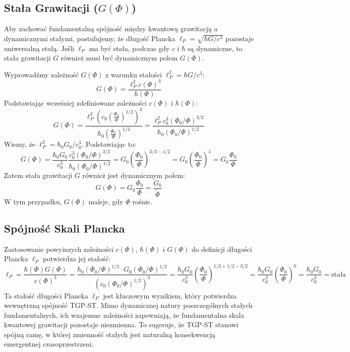 \documentclass[11pt,a4paper]{article}
\begin{document}
\subsection{Stała Grawitacji ($G(\Phi)$)}
Aby zachować fundamentalną spójność między kwantową grawitacją a dynamicznymi stałymi, postulujemy, że długość Plancka $\ell_P = \sqrt{\hbar G / c^3}$ pozostaje uniwersalną stałą. Jeśli $\ell_P$ ma być stała, podczas gdy $c$ i $\hbar$ są dynamiczne, to stała grawitacji $G$ również musi być dynamicznym polem $G(\Phi)$.

Wyprowadźmy zależność $G(\Phi)$ z warunku stałości $\ell_P^2 = \hbar G / c^3$:
$$ G(\Phi) = \frac{\ell_P^2 c(\Phi)^3}{\hbar(\Phi)} $$
Podstawiając wcześniej zdefiniowane zależności $c(\Phi)$ i $\hbar(\Phi)$:
$$ G(\Phi) = \frac{\ell_P^2 \left(c_0 \left(\frac{\Phi_0}{\Phi}\right)^{1/2}\right)^3}{\hbar_0 \left(\frac{\Phi_0}{\Phi}\right)^{1/2}} = \frac{\ell_P^2 c_0^3 (\Phi_0/\Phi)^{3/2}}{\hbar_0 (\Phi_0/\Phi)^{1/2}} $$
Wiemy, że $\ell_P^2 = \hbar_0 G_0 / c_0^3$. Podstawiając to:
$$ G(\Phi) = \frac{\hbar_0 G_0}{c_0^3} \frac{c_0^3 (\Phi_0/\Phi)^{3/2}}{\hbar_0 (\Phi_0/\Phi)^{1/2}} = G_0 \left(\frac{\Phi_0}{\Phi}\right)^{3/2 - 1/2} = G_0 \left(\frac{\Phi_0}{\Phi}\right)^1 = G_0 \frac{\Phi_0}{\Phi} $$
Zatem stała grawitacji $G$ również jest dynamicznym polem:
\begin{equation}
    G(\Phi) = G_0 \frac{\Phi_0}{\Phi} = \frac{G_0}{\tilde{\Phi}}
    \label{eq:GPhi}
\end{equation}
W tym przypadku, $G(\Phi)$ maleje, gdy $\Phi$ rośnie.

\subsection{Spójność Skali Plancka}
Zastosowanie powyższych zależności $c(\Phi)$, $\hbar(\Phi)$ i $G(\Phi)$ do definicji długości Plancka $\ell_P$ potwierdza jej stałość:
$$ \ell_P = \frac{\hbar(\Phi) G(\Phi)}{c(\Phi)^3} = \frac{\hbar_0 (\Phi_0/\Phi)^{1/2} \cdot G_0 (\Phi_0/\Phi)^{1/2}}{ (c_0 (\Phi_0/\Phi)^{1/2})^3 } = \frac{\hbar_0 G_0}{c_0^3} \left(\frac{\Phi_0}{\Phi}\right)^{1/2 + 1/2 - 3/2} = \frac{\hbar_0 G_0}{c_0^3} \left(\frac{\Phi_0}{\Phi}\right)^{0} = \frac{\hbar_0 G_0}{c_0^3} = \text{stała} $$
Ta stałość długości Plancka $\ell_P$ jest kluczowym wynikiem, który potwierdza wewnętrzną spójność TGP-ST. Mimo dynamicznej natury poszczególnych stałych fundamentalnych, ich wzajemne zależności zapewniają, że fundamentalna skala kwantowej grawitacji pozostaje niezmienna. To sugeruje, że TGP-ST stanowi spójną ramę, w której zmienność stałych jest naturalną konsekwencją emergentnej czasoprzestrzeni.
\end{document}

